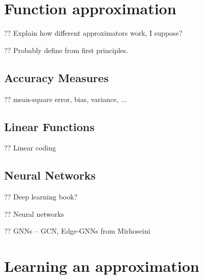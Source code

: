 \section{Function approximation}\label{sec:function-approximation}

?? Explain how different approximators work, I suppose?

?? Probably  define from first principles.

\subsection{Accuracy Measures}

?? mean-square error, bias, variance, ...

\subsection{Linear Functions}

?? Linear coding

\subsection{Neural Networks}

?? Deep learning book?~\cite{DBLP:books/daglib/0040158}

?? Neural networks

?? GNNs -- GCN, Edge-GNNs from Mirhoseini

\section{Learning an approximation}\label{sec:learning-an-approximation}%




